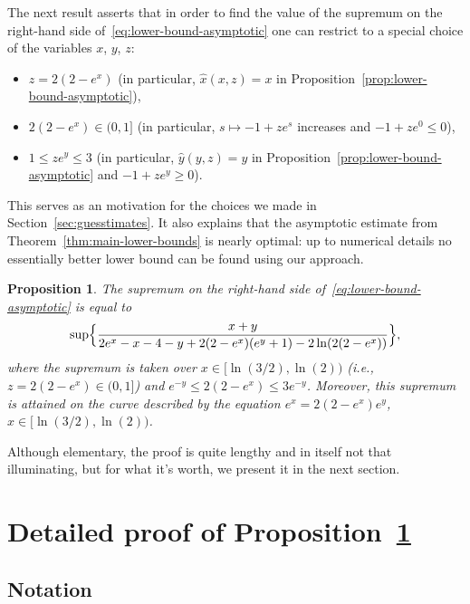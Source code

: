 \documentclass[a4paper]{amsart} %
\newtheorem{proposition}[theorem]{Proposition} %
\theoremstyle{definition}
\theoremstyle{remark}
\numberwithin{equation}{section}
\newcommand*{\xGain}{\hat{x}}
\newcommand*{\yGain}{\hat{y}}
\begin{document}
The next result asserts that
in order to find the value of the supremum on the right-hand side of~\eqref{eq:lower-bound-asymptotic}
one can restrict to a special choice of the variables $x$, $y$, $z$:
\begin{itemize}
	\item $z = 2(2-e^x)$ (in particular, $\xGain(x,z) = x$ in Proposition~\ref{prop:lower-bound-asymptotic}),
	\item $2(2-e^x) \in (0,1]$ (in particular, $s\mapsto -1 + z e^s$ increases and $-1+z e^0 \leq 0$),
	\item $1\leq z e^y \leq 3$ (in particular, $\yGain(y,z) = y$  in Proposition~\ref{prop:lower-bound-asymptotic} and $-1+ze^y \geq 0$).
\end{itemize}
This serves as an motivation 
for the choices we made in Section~\ref{sec:guesstimates}.
It also explains  that the asymptotic estimate from Theorem~\ref{thm:main-lower-bounds} is nearly optimal:
up to numerical details no essentially better lower bound can be found using our approach.


\begin{proposition}
	\label{prop:asymptotic-push}
	The supremum on the right-hand side of~\eqref{eq:lower-bound-asymptotic} 
	is equal to
	\begin{equation*}
	\sup\Bigl\{ 
	\frac{x + y}{2e^x - x -4  - y + 2(2-e^x) (e^y + 1) -2\ln(2(2-e^x))}
	\Bigr\},
	\end{equation*}
	where the supremum is taken over
	$x\in [\ln(3/2), \ln(2))$
	(i.e.,
	$z = 2(2-e^x) \in(0,1]$)
	and $e^{-y} \leq 2(2-e^x) \leq  3e^{-y}$.
	Moreover,
	this supremum is attained on the curve described by the equation
	$e^x = 2(2-e^x) e^y$, $x\in [\ln(3/2), \ln(2))$.
\end{proposition}

Although elementary,
the proof is quite lengthy and in itself not that illuminating,
but for what it's worth, 
we present it in the next section.

\section{Detailed proof of Proposition~\ref{prop:asymptotic-push}}

\label{APP:push}

\subsection{Notation}
\end{document}
